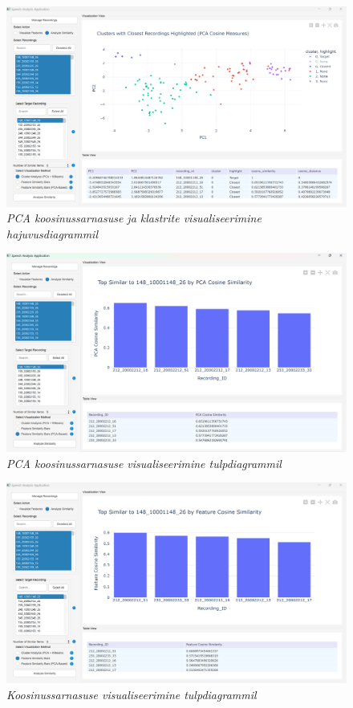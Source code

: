 \begin{figure}[ht]
    \centering
    \includegraphics[width=\textwidth]{figures/rakenduse-sarnasus-cluster-closest.png}
    \caption{\textit{PCA koosinussarnasuse ja klastrite visualiseerimine hajuvusdiagrammil}}
    \label{fig:rakenduse-sarnasus-cluster-closest}
\end{figure}

\begin{figure}[ht]
    \centering
    \includegraphics[width=\textwidth]{figures/rakenduse-sarnasus-pca-cosine.png}
    \caption{\textit{PCA koosinussarnasuse visualiseerimine tulpdiagrammil}}
    \label{fig:rakenduse-sarnasus-pca-cosine}
\end{figure}

\begin{figure}[ht]
    \centering
    \includegraphics[width=\textwidth]{figures/rakenduse-sarnasus-cosine.png}
    \caption{\textit{Koosinussarnasuse visualiseerimine tulpdiagrammil}}
    \label{fig:rakenduse-sarnasus-cosine}
\end{figure}
